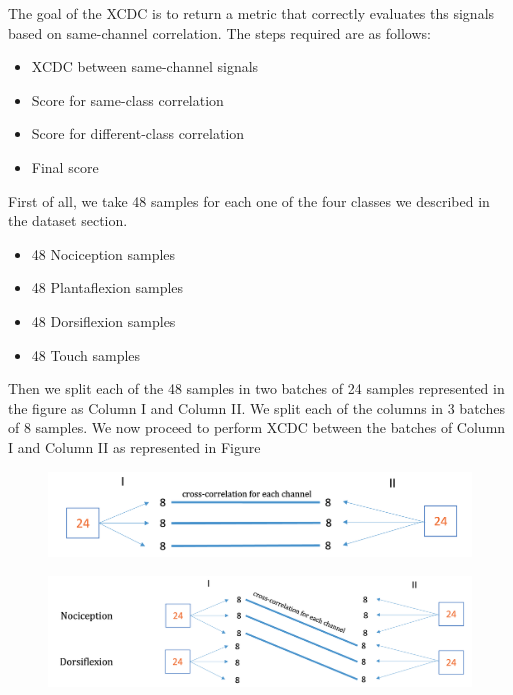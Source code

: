 \documentclass{Configuration_Files/PoliMi3i_thesis}
\begin{document}
The goal of the XCDC is to return a metric that correctly evaluates ths signals based on same-channel correlation.
The steps required are as follows:
\begin{itemize}
	\item XCDC between same-channel signals
	\item Score for same-class correlation
	\item Score for different-class correlation
	\item Final score
\end{itemize}

First of all, we take 48 samples for each one of the four classes we described in the dataset section.

\begin{itemize}
	\item 48 Nociception samples
	\item 48 Plantaflexion samples
	\item 48 Dorsiflexion samples
	\item 48 Touch samples
\end{itemize}

Then we split each of the 48 samples in two batches of 24 samples represented in the figure as Column I and Column II.
We split each of the columns in 3 batches of 8 samples.
We now proceed to perform XCDC between the batches of Column I and Column II as represented in Figure 

\begin{figure}[H]
	\includegraphics[scale=0.4]{dataSplit.png}
	\centering
	\end{figure}



	\begin{figure}[H]
		\includegraphics[scale=0.4]{scoreDifferentClass.png}
		\centering
		\end{figure}
	
\end{document}
